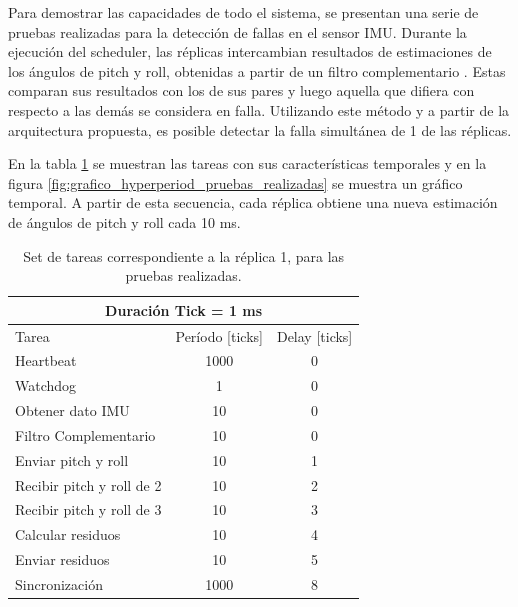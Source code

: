 Para demostrar las capacidades de todo el sistema, se presentan una serie de pruebas realizadas para la detección de fallas en el sensor IMU. Durante la ejecución del scheduler, las réplicas intercambian resultados de estimaciones de los ángulos de pitch y roll, obtenidas a partir de un filtro complementario \cite{Pose2014}. Estas comparan sus resultados con los de sus pares y luego aquella que difiera con respecto a las demás se considera en falla. Utilizando este método y a partir de la arquitectura propuesta, es posible detectar la falla simultánea de 1 de las réplicas.

En la tabla \ref{tab:schedule_pruebas_realizadas} se muestran las tareas con sus características temporales y en la figura \ref{fig:grafico_hyperperiod_pruebas_realizadas} se muestra un gráfico temporal. A partir de esta secuencia, cada réplica obtiene una nueva estimación de ángulos de pitch y roll cada 10 ms.

\begin{table}[H]
    \centering
    \begin{tabular}{|l|c|c|}
        \hline
        \multicolumn{3}{|c|}{Duración Tick = 1 ms}\\
        \hline
        Tarea & Período [ticks] & Delay [ticks]\\
        \hline
        Heartbeat                 & 1000 & 0 \\
        Watchdog                  & 1    & 0 \\ 
        Obtener dato IMU          & 10   & 0 \\
        Filtro Complementario     & 10   & 0 \\
        Enviar pitch y roll       & 10   & 1 \\
        Recibir pitch y roll de 2 & 10   & 2 \\
        Recibir pitch y roll de 3 & 10   & 3 \\
        Calcular residuos         & 10   & 4 \\
        Enviar residuos           & 10   & 5 \\
        Sincronización            & 1000 & 8 \\
        \hline
    \end{tabular}
    \caption{Set de tareas correspondiente a la réplica 1, para las pruebas realizadas.}
    \label{tab:schedule_pruebas_realizadas}
\end{table}

